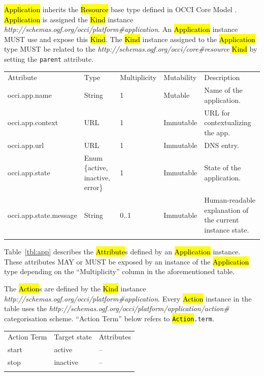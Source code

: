 \documentclass[10pt,a4paper]{article}
\begin{document}
\hl{Application} inherits the \hl{Resource} base type defined in OCCI Core Model \cite{occi:core}. \hl{Application} is assigned the \hl{Kind} instance \textit{http://schemas.ogf.org/occi/platform\#application}. An \hl{Application} instance MUST use and expose this \hl{Kind}. The \hl{Kind} instance assigned to the \hl{Application} type MUST be related to the \textit{http://schemas.ogf.org/occi/core\#resource} \hl{Kind} by setting the \texttt{parent} attribute.

{
	\begin{tabular}{lp{2.5cm}p{1cm}lp{5cm}}
	\toprule
	Attribute&Type&Multi\-plicity&Mutability&Description\\
	\colrule
	occi.app.name & String & 1 & Mutable & Name of the application.\\
	occi.app.context & URL & 1 & Immutable & URL for contextualizing the app.\\
	occi.app.url & URL & 1 & Immutable & DNS entry.\\
	occi.app.state & Enum \{active, inactive, error\} & 1 & Immutable & State of the application.\\
	occi.app.state.message & String & 0..1 & Immutable & Human-readable explanation of the current instance state.\\
	\botrule
	\end{tabular}
}

Table~\ref{tbl:app} describes the \hl{Attribute}s defined by an \hl{Application} instance. These attributes MAY or MUST be exposed by an instance of the \hl{Application} type depending on the ``Multiplicity'' column in the aforementioned table.

The \hl{Action}s are defined by the \hl{Kind} instance \textit{http://schemas.ogf.org/occi/platform\#application}. Every \hl{Action} instance in the table uses the \textit{http://schemas.ogf.org/occi/platform/application/action\#} categorisation scheme. ``Action Term'' below refers to \texttt{\hl{Action}.term}.

{
	\begin{tabular}{lll}
	\toprule
	Action Term & Target state & Attributes \\
	\colrule
	start & active & -- \\
	stop & inactive & -- \\
	\botrule
	\end{tabular}
}
\end{document}
